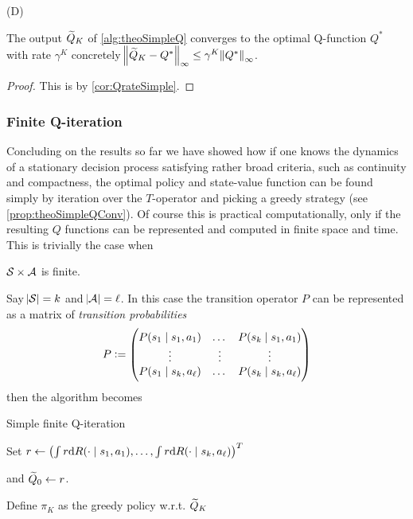 \begin{prop}(D)

  The output $\widetilde{Q}_K$ of \cref{alg:theoSimpleQ} converges to the optimal
  Q-function $Q^*$ with rate $\gamma^K$ concretely
  $\norm{\widetilde{Q}_K - Q^*}_\infty \leq \gamma^K \norm{Q^*}_\infty$.
  \label{prop:theoSimpleQConv}
\end{prop}
\begin{proof}
  This is by \cref{cor:QrateSimple}.
\end{proof}

\subsubsection{Finite Q-iteration}
Concluding on the results so far
we have showed how if one knows the dynamics
of a stationary decision process satisfying rather broad criteria, 
such as continuity and compactness,
the optimal policy and state-value function can be found
simply by iteration over the $T$-operator and picking a greedy strategy
(see \cref{prop:theoSimpleQConv}).
Of course this is practical computationally, only if
the resulting $Q$ functions can be represented and computed in finite
space and time.
This is trivially the case when
\begin{asm}
  $\mathcal{S}\times\mathcal{A}$ is finite.
  \label{asm:finite}
\end{asm}
Say $\abs{\mathcal{S}} = k$ and $\abs{\mathcal{A}} = \ell$.
In this case the transition operator $P$ can be represented as a
matrix of \emph{transition probabilities}
\[ P \vcentcolon= \begin{pmatrix}
    P(s_1 \mid s_1, a_1) & \dots & P(s_k \mid s_1, a_1)
    \\ \vdots & \vdots & \vdots
    \\ P(s_1 \mid s_k, a_\ell) & \dots & P(s_k \mid s_k, a_\ell)
\end{pmatrix} \]
then the algorithm becomes

\begin{algorithm}[H] %
\caption{Simple finite Q-iteration}
Set $ r \leftarrow \left(\int r \mathrm{d} R(\cdot \mid s_1, a_1),
\dots, \int r \mathrm{d} R(\cdot \mid s_k, a_\ell) \right)^T $

and $ \widetilde{Q}_0 \leftarrow r$.

Define $\pi_K$ as the greedy policy w.r.t. $\widetilde{Q}_K$ \\
\label{alg:finiteSimpleQ}
\end{algorithm}

